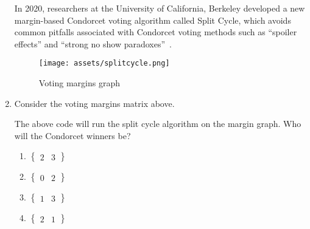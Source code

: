 \begin{enumerate}
        \vspace{0.5cm}

        In 2020, researchers at the University of California, Berkeley
        developed a new margin-based Condorcet voting algorithm called
        Split Cycle, which avoids common pitfalls associated with
        Condorcet voting methods such as ``spoiler effects'' and
        ``strong no show paradoxes''~\cite{splitcycle}.

        \bigskip

        \begin{figure}[h]
          \centering
          \texttt{[image: assets/splitcycle.png]}
          \label{}
          \caption{Voting margins graph}
        \end{figure}

  \columnbreak

  \item Consider the voting margins matrix above.
        

        The above code will run the split cycle algorithm on the margin
        graph. Who will the Condorcet winners be?

        \begin{enumerate}
          \item $\begin{Bmatrix} 2 & 3 \end{Bmatrix}$
          \item $\begin{Bmatrix} 0 & 2 \end{Bmatrix}$
          \item $\begin{Bmatrix} 1 & 3 \end{Bmatrix}$
          \item $\begin{Bmatrix} 2 & 1 \end{Bmatrix}$
        \end{enumerate}
\end{enumerate}
